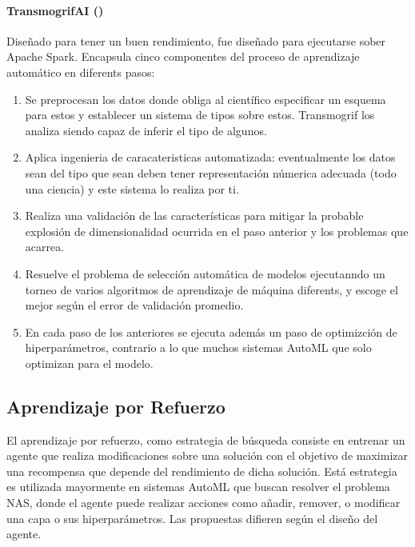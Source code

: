        \paragraph{TransmogrifAI (\cite{tovbin93meet})}  Diseñado para tener un buen rendimiento, fue dise\~nado para ejecutarse sober Apache Spark. Encapsula cinco componentes del proceso de aprendizaje autom\'atico en diferents pasos:
        \begin{enumerate}
            \item Se preprocesan los datos donde obliga al cient\'ifico especificar un esquema para estos y establecer un sistema de tipos sobre estos. Transmogrif los analiza siendo capaz de inferir el tipo de algunos.
            \item Aplica ingenieria de caracateristicas automatizada: eventualmente los datos sean del tipo que sean deben tener representaci\'on n\'umerica adecuada (todo una ciencia) y este sistema lo realiza por ti.
            \item Realiza una validaci\'on de las caracter\'isticas para mitigar  la probable explosi\'on de dimensionalidad ocurrida en el paso anterior y los problemas que acarrea.
            \item Resuelve el problema de selecci\'on autom\'atica de modelos ejecutanndo un torneo de varios algoritmos de aprendizaje de m\'aquina diferents, y escoge el mejor seg\'un el error de validaci\'on promedio.
            \item En cada paso de los anteriores se ejecuta adem\'as un paso de optimizci\'on de hiperpar\'ametros, contrario a lo que muchos sistemas AutoML que solo optimizan para el modelo. 
        \end{enumerate}


\subsection{Aprendizaje por Refuerzo}
El aprendizaje por refuerzo, como estrategia de b\'usqueda consiste en entrenar un agente que realiza modificaciones sobre una soluci\'on con el objetivo de maximizar una recompensa que depende del rendimiento de dicha soluci\'on. Est\'a estrategia es utilizada mayormente en sistemas AutoML que buscan resolver el problema NAS, donde el agente puede realizar acciones como a\~nadir, remover, o modificar una capa o sus hiperpar\'ametros. Las propuestas difieren seg\'un el dise\~no del agente.

